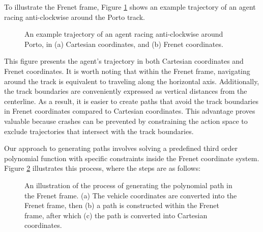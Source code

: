 To illustrate the Frenet frame, Figure \ref{fig:frenet_frame} shows an example trajectory of an agent racing anti-clockwise around the Porto track. 
\begin{figure}[b]
    \centering
    
    \caption[An example of a trajectory in Cartestian and Frenet coordinates]{An example trajectory of an agent racing anti-clockwise around Porto, in (a) Cartesian coordinates, and (b) Frenet coordinates.}
    \label{fig:frenet_frame}
\end{figure}
This figure presents the agent's trajectory in both Cartesian coordinates and Frenet coordinates. 
It is worth noting that within the Frenet frame, navigating around the track is equivalent to traveling along the horizontal axis. 
Additionally, the track boundaries are conveniently expressed as vertical distances from the centerline. 
As a result, it is easier to create paths that avoid the track boundaries in Frenet coordinates compared to Cartesian coordinates. 
This advantage proves valuable because crashes can be prevented by constraining the action space to exclude trajectories that intersect with the track boundaries.


Our approach to generating paths involves solving a predefined third order polynomial function with specific constraints inside the Frenet coordinate system.
Figure \ref{fig:polynomial_path_generation} illustrates this process, where the steps are as follows: 

\begin{figure}[b]
    \centering
    
    \caption[Generating the path in the Frenet frame]{An illustration of the process of generating the polynomial path in the Frenet frame. (a) The vehicle coordinates are converted into the Frenet frame, then (b) a path is constructed within the Frenet frame, after which (c) the path is converted into Cartesian coordinates.}
    \label{fig:polynomial_path_generation}
\end{figure}

